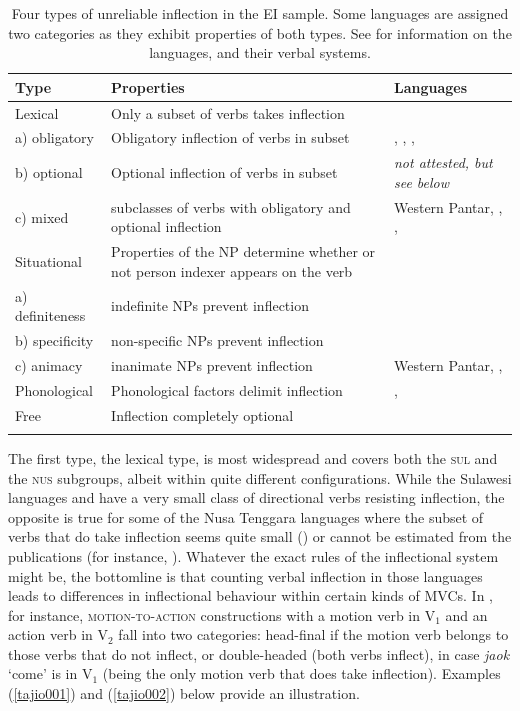 \begin{table}
\begin{tabularx}{\textwidth}{l p{4.7cm} Q}
  \lsptoprule
Type & Properties & Languages \tabularnewline 
  \midrule
Lexical & Only a subset of verbs takes inflection &  \tabularnewline \tablevspace
a) obligatory & Obligatory inflection of verbs in subset & , , ,  \tabularnewline
\tablevspace
b) optional & Optional inflection of verbs in subset & \textit{not attested, but see below} \tabularnewline
\tablevspace
c) mixed & subclasses of verbs with obligatory and optional inflection & Western Pantar, , ,  \tabularnewline
\midrule
Situational & Properties of the NP determine whether or not person indexer appears on the verb & \tabularnewline
\tablevspace
a) definiteness & indefinite NPs prevent inflection &  \tabularnewline
\tablevspace
b) specificity & non-specific NPs prevent inflection &  \tabularnewline
\tablevspace
c) animacy & inanimate NPs prevent inflection & Western Pantar, ,  \tabularnewline
\midrule
Phonological & Phonological factors delimit inflection & ,  \tabularnewline
\midrule
Free & Inflection completely optional &  \tabularnewline
   \lspbottomrule
\end{tabularx}
\caption[Types of unreliable inflection in EI languages]{Four types of unreliable inflection in the EI sample. Some languages are assigned two categories as they exhibit properties of both types. See  for information on the languages, and their verbal systems.}
\label{table:unreliable}
\end{table}

The first type, the lexical type, is most widespread and covers both the \textsc{sul} and the \textsc{nus} subgroups, albeit within quite different configurations. While the Sulawesi languages  and  have a very small class of directional verbs resisting inflection, the opposite is true for some of the Nusa Tenggara languages where the subset of verbs that do take inflection seems quite small () or cannot be estimated from the publications (for instance, ). Whatever the exact rules of the inflectional system might be, the bottomline is that counting verbal inflection in those languages leads to differences in inflectional behaviour within certain kinds of MVCs. In , for instance, \textsc{motion-to-action} constructions with a motion verb in V$_1$ and an action verb in V$_2$  fall into two categories: head-final if the motion verb belongs to those verbs that do not inflect, or double-headed (both verbs inflect), in case \textit{jaok} `come' is in V$_1$ (being the only motion verb that does take inflection). Examples (\ref{tajio001}) and (\ref{tajio002}) below provide an illustration.

